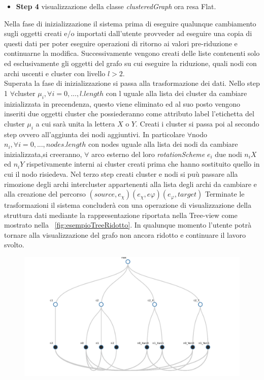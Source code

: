 {\begin{itemize}
	\item \textbf{Step 4} visualizzazione della classe \textit{clusteredGraph} ora resa Flat.
\end{itemize}
Nella fase di inizializzazione il sistema prima di eseguire qualunque cambiamento sugli oggetti creati e/o importati dall'utente provveder ad eseguire una copia di questi dati per poter eseguire operazioni di ritorno ai valori pre-riduzione e continuarne la modifica. Successivamente vengono creati delle liste contenenti solo ed esclusivamente gli oggetti del grafo su cui eseguire la riduzione, quali nodi con archi uscenti e cluster con livello $l>2$.\\
Superata la fase di inizializzazione si passa alla trasformazione dei dati. Nello step 1 $\forall$cluster $\mu_i, \forall i=0,...,l.length$ con l uguale alla lista dei cluster da cambiare inizializzata in precendenza, questo viene eliminato ed al suo posto vengono inseriti due oggetti cluster che possiederanno come attributo label l'etichetta del cluster $\mu_i$ a cui sarà unita la lettera $X$ o $Y$. 
Creati i cluster si passa poi al secondo step ovvero all'aggiunta dei nodi aggiuntivi. In particolare $\forall$nodo $n_i, \forall i=0,...,nodes.length$ con nodes uguale alla lista dei nodi da cambiare inizializzata,si creeranno, $\forall$ arco esterno del loro \textit{rotationScheme} $e_i$ due nodi $n_iX$ ed $n_iY$ rispetivamente interni ai cluster creati prima che hanno sostituito quello in cui il nodo risiedeva.
Nel terzo step creati cluster e nodi si puù passare alla rimozione degli archi intercluster appartenenti alla lista degli archi da cambiare e alla creazione del percorso $(source, e_\chi)(e_\chi, e\varphi) (e_\varphi, target)$
Terminate le trasformazioni il sistema concluderà con una operazione di visualizzazione della struttura dati mediante la rappresentazione riportata nella Tree-view come mostrato nella \figurename~\ref{fig:esempioTreeRidotto}.
In qualunque momento l'utente potrà tornare alla visualizzazione del grafo non ancora ridotto e continuare il lavoro svolto.
\begin{figure}[!htb]
	\begin{center}
		\includegraphics[width=1 \linewidth]{figure/esempioTreeRidotto}

\end{center}
\end{figure}}
